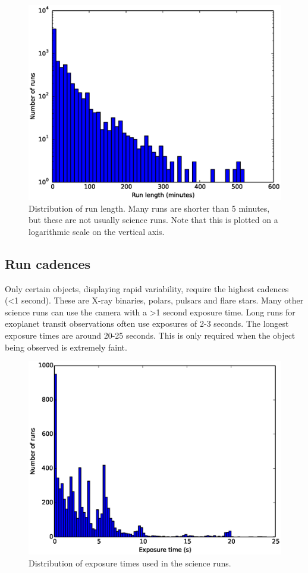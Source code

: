 \begin{figure}
  \centering
  \includegraphics[width=120mm]{images/hist0-600_log.eps}
  \caption{Distribution of run length. Many runs are shorter than 5 minutes, but these are not usually science runs. Note that this is plotted on a logarithmic scale on the vertical axis. }
  \label{fig:histogram0-600}
\end{figure}

\subsection{Run cadences}
Only certain objects, displaying rapid variability, require the highest cadences (\textless 1 second). These are X-ray binaries, polars, pulsars and flare stars. Many other science runs can use the camera with a \textgreater 1 second exposure time. Long runs for exoplanet transit observations often use exposures of 2-3 seconds. The longest exposure times are around 20-25 seconds. This is only required when the object being observed is extremely faint.  

\begin{figure}
  \centering
  \includegraphics[width=120mm]{images/cadences_hist0-25.eps}
  \caption{Distribution of exposure times used in the science runs.}
  \label{fig:cadences}
\end{figure}

